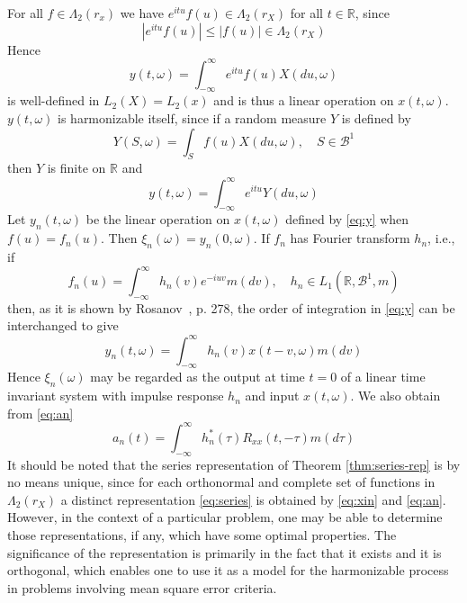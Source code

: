\documentclass{article}
\begin{document}
For all $f \in \Lambda_2 (r_x)$ we have $e^{itu} f (u) \in \Lambda_2 (r_X)$
for all $t \in \mathbb{R}$, since
\begin{equation}
  |e^{itu} f (u) | \leqslant |f (u) | \in \Lambda_2 (r_X) \label{eq:expf}
\end{equation}
Hence
\begin{equation}
  y (t, \omega) = \int_{- \infty}^{\infty} e^{itu} f (u) X (du, \omega)
  \label{eq:y}
\end{equation}
is well-defined in $L_2 (X) = L_2 (x)$ and is thus a linear operation on $x
(t, \omega)$. $y (t, \omega)$ is harmonizable itself, since if a random
measure $Y$ is defined by
\begin{equation}
  Y (S, \omega) = \int_S f (u) X (du, \omega), \quad S \in \mathscr{B}^1
  \label{eq:Y}
\end{equation}
then $Y$ is finite on $\mathbb{R}$ and
\begin{equation}
  y (t, \omega) = \int_{- \infty}^{\infty} e^{itu} Y (du, \omega)
  \label{eq:yY}
\end{equation}
Let $y_n  (t, \omega)$ be the linear operation on $x (t, \omega)$ defined by
\eqref{eq:y} when $f (u) = f_n (u)$. Then $\xi_n (\omega) = y_n  (0, \omega)$.
If $f_n$ has Fourier transform $h_n$, i.e., if
\begin{equation}
  f_n (u) = \int_{- \infty}^{\infty} h_n (v) e^{- iuv} m (dv), \quad h_n \in
  L_1 (\mathbb{R}, \mathscr{B}^1, m) \label{eq:fnFourier}
\end{equation}
then, as it is shown by Rosanov~{\cite{rosanov1959}}, p. 278, the order of
integration in \eqref{eq:y} can be interchanged to give
\begin{equation}
  y_n  (t, \omega) = \int_{- \infty}^{\infty} h_n (v) x (t - v, \omega) m (dv)
  \label{eq:yn}
\end{equation}
Hence $\xi_n (\omega)$ may be regarded as the output at time $t = 0$ of a
linear time invariant system with impulse response $h_n$ and input $x (t,
\omega)$. We also obtain from \eqref{eq:an}
\begin{equation}
  a_n (t) = \int_{- \infty}^{\infty} h_n^{\ast} (\tau) R_{xx} (t, - \tau) m (d
  \tau) \label{eq:an-hn}
\end{equation}
It should be noted that the series representation of Theorem
\ref{thm:series-rep} is by no means unique, since for each orthonormal and
complete set of functions in $\Lambda_2 (r_X)$ a distinct representation
\eqref{eq:series} is obtained by \eqref{eq:xin} and \eqref{eq:an}. However, in
the context of a particular problem, one may be able to determine those
representations, if any, which have some optimal properties. The significance
of the representation is primarily in the fact that it exists and it is
orthogonal, which enables one to use it as a model for the harmonizable
process in problems involving mean square error criteria.
\end{document}
